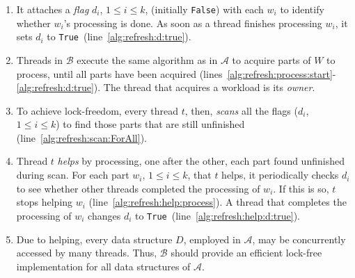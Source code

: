 \documentclass[a4paper,11pt,twoside,openany]{book}
\newcommand{\True}{\mbox{\texttt{True}}}
\newcommand{\False}{\mbox{\texttt{False}}}
\begin{document}
\newpage

\begin{enumerate}
    \item It attaches a {\em flag} $d_i$, $1 \leq i \leq k$, (initially \False)  
    with each $w_i$ to identify whether $w_i$'s processing is done.  
    As soon as a thread finishes processing $w_i$, it sets $d_i$ to \True\ (line~\ref{alg:refresh:d:true}).  

    \item Threads in $\mathcal{B}$ execute the same algorithm as in $\mathcal{A}$ to acquire parts of $W$ to process,  
    until all parts have been acquired (lines~\ref{alg:refresh:process:start}-\ref{alg:refresh:d:true}).  
    The thread that acquires a workload is its {\em owner}.  

    \item To achieve lock-freedom, every thread $t$, then, {\em scans} all the flags ($d_i$, $1 \leq i \leq k$)  
    to find those parts that are still unfinished (line~\ref{alg:refresh:scan:ForAll}).  

    \item Thread $t$ {\em helps} by processing, one after the other, each part found unfinished during scan.  
    For each part $w_i$, $1 \leq i \leq k$, that $t$ helps, it periodically checks $d_i$  
    to see whether other threads completed the processing of $w_i$. If this is so,  
    $t$ stops helping $w_i$ (line~\ref{alg:refresh:help:process}).  
    A thread that completes the processing of $w_i$ changes $d_i$ to \True\ (line~\ref{alg:refresh:help:d:true}).  

    \item Due to helping, every data structure $D$, employed in $\mathcal{A}$, may be  
    concurrently accessed by many threads. Thus, $\mathcal{B}$ should provide an efficient  
    lock-free implementation for all data structures of $\mathcal{A}$.  
\end{enumerate}
\end{document}
